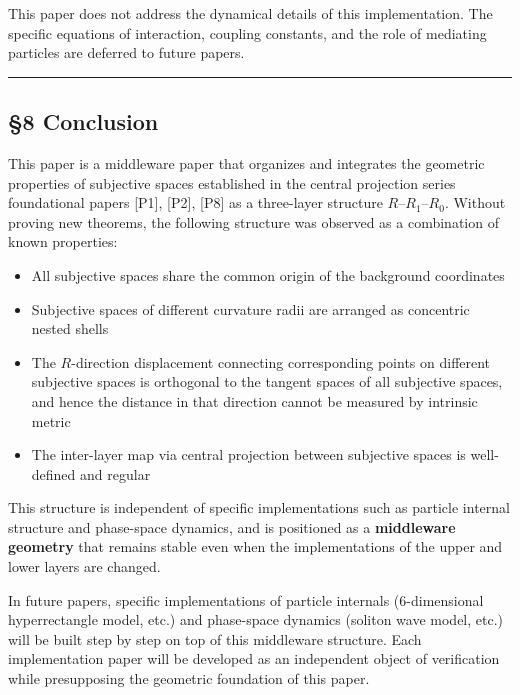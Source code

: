 \documentclass[
  a4paper,11pt]{article}
\providecommand{\tightlist}{%
  \setlength{\itemsep}{0pt}\setlength{\parskip}{0pt}}
\begin{document}
This paper does not address the dynamical details of this
implementation. The specific equations of interaction, coupling
constants, and the role of mediating particles are deferred to future
papers.

\begin{center}\rule{0.5\linewidth}{0.5pt}\end{center}

\subsection{§8 Conclusion}\label{conclusion}

This paper is a middleware paper that organizes and integrates the
geometric properties of subjective spaces established in the central
projection series foundational papers {[}P1{]}, {[}P2{]}, {[}P8{]} as a
three-layer structure \(R\)--\(R_1\)--\(R_0\). Without proving new
theorems, the following structure was observed as a combination of known
properties:

\begin{itemize}
\tightlist
\item
  All subjective spaces share the common origin of the background
  coordinates
\item
  Subjective spaces of different curvature radii are arranged as
  concentric nested shells
\item
  The \(R\)-direction displacement connecting corresponding points on
  different subjective spaces is orthogonal to the tangent spaces of all
  subjective spaces, and hence the distance in that direction cannot be
  measured by intrinsic metric
\item
  The inter-layer map via central projection between subjective spaces
  is well-defined and regular
\end{itemize}

This structure is independent of specific implementations such as
particle internal structure and phase-space dynamics, and is positioned
as a \textbf{middleware geometry} that remains stable even when the
implementations of the upper and lower layers are changed.

In future papers, specific implementations of particle internals
(6-dimensional hyperrectangle model, etc.) and phase-space dynamics
(soliton wave model, etc.) will be built step by step on top of this
middleware structure. Each implementation paper will be developed as an
independent object of verification while presupposing the geometric
foundation of this paper.
\end{document}
